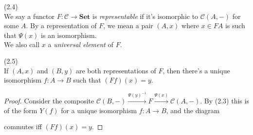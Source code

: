 \documentclass[a4paper]{article}
\begin{document}
\begin{defi} (2.4)\\
    We say a functor $F:\mathcal{C} \to \mathbf{Set}$ is \emph{representable} if it's isomorphic to $\mathcal{C}(A,-)$ for some $A$. By a representation of $F$, we mean a pair $(A,x)$ where $x \in FA$ is such that $\Psi(x)$ is an isomorphism.\\
    We also call $x$ a \emph{universal element} of $F$.
\end{defi}

\begin{coro} (2.5)\\
    If $(A,x)$ and $(B,y)$ are both representations of $F$, then there's a unique isomorphism $f:A \to B$ such that $(Ff)(x) = y$.
    \begin{proof}
        Consider the composite $\mathcal{C}(B,-) \xrightarrow{\Psi(y)^{-1}}F \xrightarrow{\Psi(x)} \mathcal{C}(A,-)$. By (2.3) this is of the form $Y(f)$ for a unique isomorphism $f:A \to B$, and the diagram


        commutes iff $(Ff)(x) = y$.
    \end{proof}
\end{coro}
\end{document}
